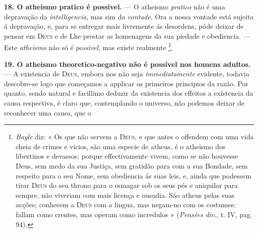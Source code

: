  \textbf{18. O atheismo pratico é possivel.} --- O atheismo \emph{pratico} não é uma depravação da \emph{intelligencia}, mas sim da \emph{vontade}. Ora a nossa vontade está sujeita á depravação, e, para se entregar mais livremente ás desordens, póde deixar de pensar em \textsc{Deus} e de Lhe prestar as homenagens da sua piedade e obediencia. --- Este \emph{atheismo} não só é \emph{possivel}, mas existe realmente \footnote{\emph{Bayle} diz: « Os que não servem a \textsc{Deus}, e que antes o offendem com uma vida cheia de crimes e vicios, são uma especie de atheus, é o atheismo dos libertinos e devassos; porque effectivamente vivem, como se não houvesse Deus, sem medo da sua Justiça, sem gratidão para com a sua Bondade, sem respeito para o seu Nome, sem obediencia ás suas leis, e, ainda que podessem tirar \textsc{Deus} do seu throno para o esmagar sob os seus pés e aniquilar para sempre, não viveriam com mais licença e ousadia. São atheus pelas suas acções; conhecem a \textsc{Deus} com a lingua, mas negam-no com os costumes; fallam como crentes, mas operam como incredulos » (\emph{Pensées div.}, t. IV, pag. 94).}.

\textbf{19. O atheismo theoretico-negativo não é possível nos homens adultos.} --- A existencia de \textsc{Deus}, embora nos não seja \emph{immediatamente} evidente, todavia descobre-se logo que começamos a applicar os primeiros principios da razão. Por quanto, sendo natural e facillimo deduzir da existencia dos effeitos a existencia da causa respectiva, é claro que, contemplando o universo, não podemos deixar de reconhecer uma causa, que o